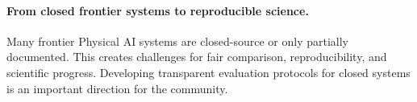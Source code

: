 \paragraph{From closed frontier systems to reproducible science.}
Many frontier Physical AI systems are closed-source or only partially documented. 
This creates challenges for fair comparison, reproducibility, and scientific progress. 
Developing transparent evaluation protocols for closed systems is an important direction for the community.